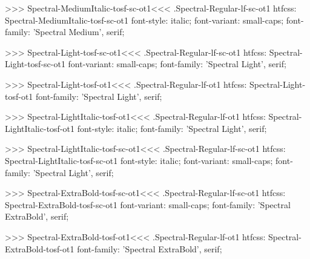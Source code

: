 >>>
\<Spectral-MediumItalic-tosf-sc-ot1\><<<
.Spectral-Regular-lf-sc-ot1
htfcss:  Spectral-MediumItalic-tosf-sc-ot1  font-style: italic; font-variant: small-caps; font-family: 'Spectral Medium', serif;

>>>
\<Spectral-Light-tosf-sc-ot1\><<<
.Spectral-Regular-lf-sc-ot1
htfcss:  Spectral-Light-tosf-sc-ot1  font-variant: small-caps; font-family: 'Spectral Light', serif;

>>>
\<Spectral-Light-tosf-ot1\><<<
.Spectral-Regular-lf-ot1
htfcss:  Spectral-Light-tosf-ot1  font-family: 'Spectral Light', serif;

>>>
\<Spectral-LightItalic-tosf-ot1\><<<
.Spectral-Regular-lf-ot1
htfcss:  Spectral-LightItalic-tosf-ot1  font-style: italic; font-family: 'Spectral Light', serif;

>>>
\<Spectral-LightItalic-tosf-sc-ot1\><<<
.Spectral-Regular-lf-sc-ot1
htfcss:  Spectral-LightItalic-tosf-sc-ot1  font-style: italic; font-variant: small-caps; font-family: 'Spectral Light', serif;

>>>
\<Spectral-ExtraBold-tosf-sc-ot1\><<<
.Spectral-Regular-lf-sc-ot1
htfcss:  Spectral-ExtraBold-tosf-sc-ot1  font-variant: small-caps; font-family: 'Spectral ExtraBold', serif;

>>>
\<Spectral-ExtraBold-tosf-ot1\><<<
.Spectral-Regular-lf-ot1
htfcss:  Spectral-ExtraBold-tosf-ot1  font-family: 'Spectral ExtraBold', serif;

